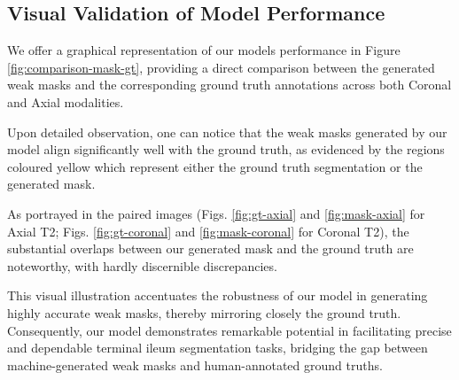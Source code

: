 \subsection{Visual Validation of Model Performance}
We offer a graphical representation of our models performance in Figure \ref{fig:comparison-mask-gt}, providing a direct comparison between the generated weak masks and the corresponding ground truth annotations across both Coronal and Axial modalities.

Upon detailed observation, one can notice that the weak masks generated by our model align significantly well with the ground truth, as evidenced by the regions coloured yellow which represent either the ground truth segmentation or the generated mask.

As portrayed in the paired images (Figs. \ref{fig:gt-axial} and \ref{fig:mask-axial} for Axial T2; Figs. \ref{fig:gt-coronal} and \ref{fig:mask-coronal} for Coronal T2), the substantial overlaps between our generated mask and the ground truth are noteworthy, with hardly discernible discrepancies.

This visual illustration accentuates the robustness of our model in generating highly accurate weak masks, thereby mirroring closely the ground truth. Consequently, our model demonstrates remarkable potential in facilitating precise and dependable terminal ileum segmentation tasks, bridging the gap between machine-generated weak masks and human-annotated ground truths.

